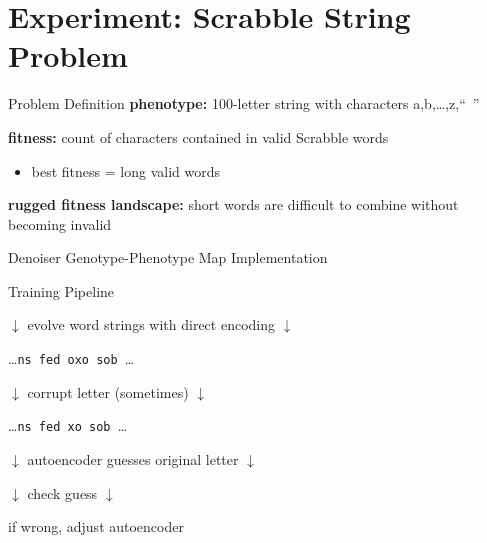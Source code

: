 \section{Experiment: Scrabble String Problem}

\begin{frame}{Problem Definition}
\textbf{phenotype:} 100-letter string with characters a,b,\dots,z,``~''
\vspace{2ex}
\pause

\textbf{fitness:} count of characters contained in valid Scrabble words
\begin{itemize}
\item best fitness = long valid words
\end{itemize}

\vspace{2ex}
\pause

\textbf{rugged fitness landscape:}
short words are difficult to combine without becoming invalid

\end{frame}

\begin{frame}{Denoiser Genotype-Phenotype Map Implementation}



\end{frame}

\begin{frame}{Training Pipeline}

\centering \Large

\textcolor{h2}{$\downarrow$ evolve word strings with direct encoding $\downarrow$}

\dots\texttt{ns fed oxo sob }\dots

\pause

\textcolor{h2}{$\downarrow$ corrupt letter (sometimes) $\downarrow$}

\dots\texttt{ns fed xo sob }\dots

\pause

\textcolor{h2}{$\downarrow$ autoencoder guesses original letter $\downarrow$}

\texttt{}

\pause

\textcolor{h2}{$\downarrow$ check guess $\downarrow$}

if wrong, adjust autoencoder

\end{frame}

